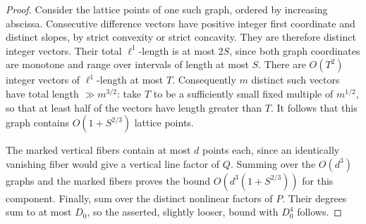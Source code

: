 \begin{proof}
Consider the lattice points of one such graph, ordered by increasing
abscissa.  Consecutive difference vectors have positive integer first
coordinate and distinct slopes, by strict convexity or strict
concavity.  They are therefore distinct integer vectors.
Their total \(\ell^1\)-length is at most \(2S\), since both graph
coordinates are monotone and range over intervals of length at most
\(S\).  There are \(O(T^2)\) integer vectors of \(\ell^1\)-length at most
\(T\).  Consequently \(m\) distinct such vectors have total length
\(\gg m^{3/2}\): take \(T\) to be a sufficiently small fixed multiple
of \(m^{1/2}\), so that at least half of the vectors have length greater
than \(T\).  It follows that this graph contains
\(O(1+S^{2/3})\) lattice points.

The marked vertical fibers contain at most \(d\) points each, since
an identically vanishing fiber would give a vertical line factor of
\(Q\).  Summing over the \(O(d^3)\) graphs and the marked fibers proves
the bound \(O(d^3(1+S^{2/3}))\) for this component.
Finally, sum over the distinct nonlinear factors of \(P\).  Their
degrees sum to at most \(D_0\), so the asserted, slightly looser,
bound with \(D_0^4\) follows.
\end{proof}

